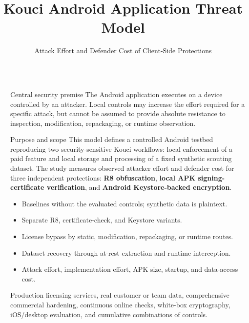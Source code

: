 \documentclass[final]{beamer}
\title{Kouci Android Application Threat Model}
\author{Attack Effort and Defender Cost of Client-Side Protections}
\institute{MSc in Cybersecurity, University of Minho \samelineand Supervisor: Vítor Fonte}
\newlength{\sepwidth}
\newlength{\colwidth}
\newcommand{\separatorcolumn}{\begin{column}{\sepwidth}\end{column}}
\begin{document}
\begin{frame}[t]
\begin{columns}[t]
\separatorcolumn

\begin{column}{\colwidth}

\begin{alertblock}{Central security premise}
  The Android application executes on a device controlled by an attacker.
  Local controls may increase the effort required for a specific attack, but
  cannot be assumed to provide absolute resistance to inspection, modification,
  repackaging, or runtime observation.
\end{alertblock}

\begin{block}{Purpose and scope}
  This model defines a controlled Android testbed reproducing two
  security-sensitive Kouci workflows: local enforcement of a paid feature and
  local storage and processing of a fixed synthetic scouting dataset. The study
  measures observed attacker effort and defender cost for three independent
  protections: \textbf{R8 obfuscation}, \textbf{local APK signing-certificate
  verification}, and \textbf{Android Keystore-backed encryption}.

  \begin{itemize}
    \item Baselines without the evaluated controls; synthetic data is plaintext.
    \item Separate R8, certificate-check, and Keystore variants.
    \item License bypass by static, modification, repackaging, or runtime routes.
    \item Dataset recovery through at-rest extraction and runtime interception.
    \item Attack effort, implementation effort, APK size, startup, and data-access cost.
  \end{itemize}

  Production licensing services, real customer or team data, comprehensive
  commercial hardening, continuous online checks, white-box cryptography,
  iOS/desktop evaluation, and cumulative combinations of controls.
\end{block}


\end{column}
\end{columns}
\end{frame}
\end{document}
